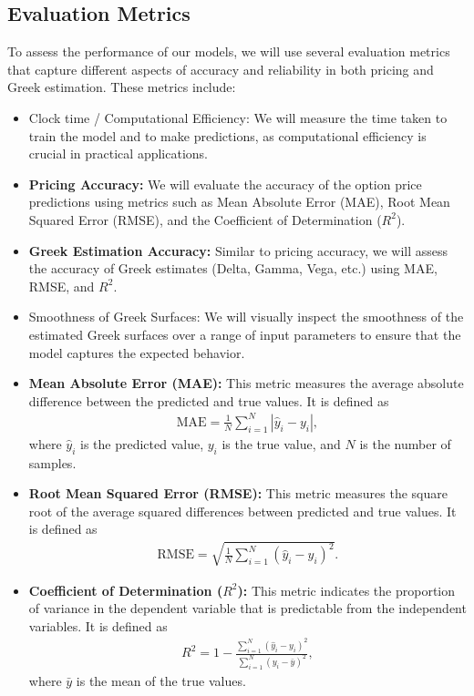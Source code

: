 \subsection{Evaluation Metrics} \label{sec:eval_metrics}

To assess the performance of our models, we will use several evaluation metrics that capture different aspects of accuracy and reliability in both pricing and Greek estimation. These metrics include:
\begin{itemize}
    \item Clock time / Computational Efficiency: We will measure the time taken to train the model and to make predictions, as computational efficiency is crucial in practical applications.
    \item \textbf{Pricing Accuracy:} We will evaluate the accuracy of the option price predictions using metrics such as Mean Absolute Error (MAE), Root Mean Squared Error (RMSE), and the Coefficient of Determination ($R^2$).
    \item \textbf{Greek Estimation Accuracy:} Similar to pricing accuracy, we will assess the accuracy of Greek estimates (Delta, Gamma, Vega, etc.) using MAE, RMSE, and $R^2$. 
    \item Smoothness of Greek Surfaces: We will visually inspect the smoothness of the estimated Greek surfaces over a range of input parameters to ensure that the model captures the expected behavior.
    \item \textbf{Mean Absolute Error (MAE):} This metric measures the average absolute difference between the predicted and true values. It is defined as
    \begin{align}
        \text{MAE} = \frac{1}{N} \sum_{i=1}^N | \hat{y}_i - y_i |,
    \end{align}
    where $\hat{y}_i$ is the predicted value, $y_i$ is the true value, and $N$ is the number of samples.
    
    \item \textbf{Root Mean Squared Error (RMSE):} This metric measures the square root of the average squared differences between predicted and true values. It is defined as
    \begin{align}
        \text{RMSE} = \sqrt{\frac{1}{N} \sum_{i=1}^N (\hat{y}_i - y_i)^2}.
    \end{align}
    
    \item \textbf{Coefficient of Determination ($R^2$):} This metric indicates the proportion of variance in the dependent variable that is predictable from the independent variables. It is defined as
    \begin{align}
        R^2 = 1 - \frac{\sum_{i=1}^N (\hat{y}_i - y_i)^2}{\sum_{i=1}^N (y_i - \bar{y})^2},
    \end{align}
    where $\bar{y}$ is the mean of the true values.
    

\end{itemize}
